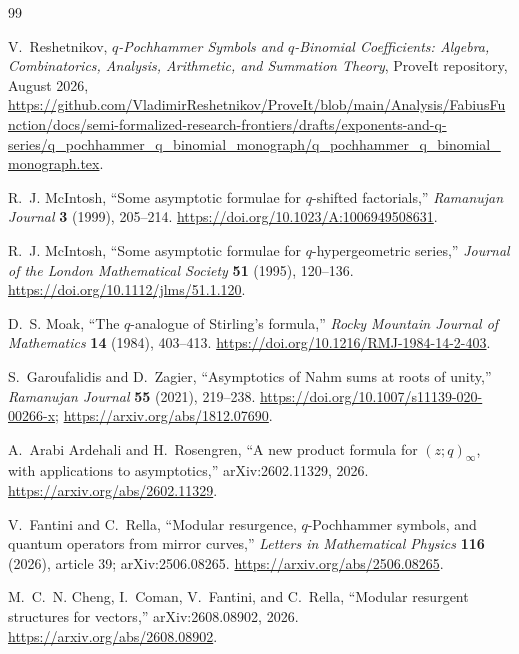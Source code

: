\documentclass[11pt,oneside]{article}
\theoremstyle{definition}
\theoremstyle{remark}
\begin{document}
\begin{thebibliography}{99}
\sloppy

V.~Reshetnikov,
\emph{$q$-Pochhammer Symbols and $q$-Binomial Coefficients: Algebra,
Combinatorics, Analysis, Arithmetic, and Summation Theory},
ProveIt repository, August 2026,
\url{https://github.com/VladimirReshetnikov/ProveIt/blob/main/Analysis/FabiusFunction/docs/semi-formalized-research-frontiers/drafts/exponents-and-q-series/q_pochhammer_q_binomial_monograph/q_pochhammer_q_binomial_monograph.tex}.

R.~J. McIntosh,
``Some asymptotic formulae for $q$-shifted factorials,''
\emph{Ramanujan Journal} \textbf{3} (1999), 205--214.
\url{https://doi.org/10.1023/A:1006949508631}.

R.~J. McIntosh,
``Some asymptotic formulae for $q$-hypergeometric series,''
\emph{Journal of the London Mathematical Society} \textbf{51} (1995),
120--136.
\url{https://doi.org/10.1112/jlms/51.1.120}.

D.~S. Moak,
``The $q$-analogue of Stirling's formula,''
\emph{Rocky Mountain Journal of Mathematics} \textbf{14} (1984), 403--413.
\url{https://doi.org/10.1216/RMJ-1984-14-2-403}.

S.~Garoufalidis and D.~Zagier,
``Asymptotics of Nahm sums at roots of unity,''
\emph{Ramanujan Journal} \textbf{55} (2021), 219--238.
\url{https://doi.org/10.1007/s11139-020-00266-x};
\url{https://arxiv.org/abs/1812.07690}.

A.~Arabi Ardehali and H.~Rosengren,
``A new product formula for $(z;q)_\infty$, with applications to asymptotics,''
arXiv:2602.11329, 2026.
\url{https://arxiv.org/abs/2602.11329}.

V.~Fantini and C.~Rella,
``Modular resurgence, $q$-Pochhammer symbols, and quantum operators from
mirror curves,''
\emph{Letters in Mathematical Physics} \textbf{116} (2026), article 39;
arXiv:2506.08265.
\url{https://arxiv.org/abs/2506.08265}.

M.~C.~N. Cheng, I.~Coman, V.~Fantini, and C.~Rella,
``Modular resurgent structures for vectors,''
arXiv:2608.08902, 2026.
\url{https://arxiv.org/abs/2608.08902}.

\end{thebibliography}
\end{document}
